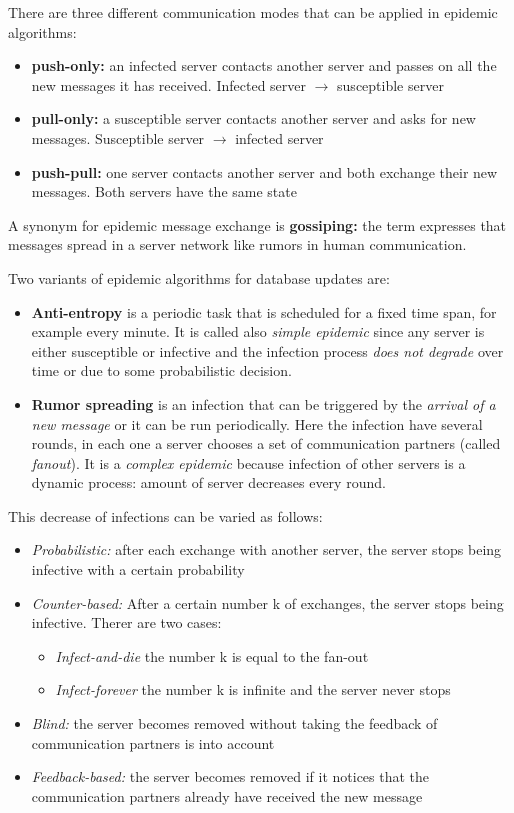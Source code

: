 There are three different communication modes that can be applied in epidemic algorithms:
\begin{itemize}
    \item \textbf{push-only:} an infected server contacts another server and passes on all the new messages it has received. Infected server \(\rightarrow\) susceptible server
    \item \textbf{pull-only:} a susceptible server contacts another server and asks for new messages. Susceptible server \(\rightarrow\) infected server
    \item \textbf{push-pull:} one server contacts another server and both
exchange their new messages. Both servers have the same state
\end{itemize}

A synonym for epidemic message exchange is \textbf{gossiping:} the term expresses that messages spread in a server network like rumors in human communication.

Two variants of epidemic algorithms for database updates are:
\begin{itemize}
    \item \textbf{Anti-entropy} is a periodic task that is scheduled for a fixed time span, for example every minute. It is called also \textit{simple epidemic} since any server is either susceptible or infective and the infection process \textit{does not degrade} over time or due to some probabilistic decision.
    \item \textbf{Rumor spreading} is an infection that can be triggered by the \textit{arrival of a new message} or it can be run periodically. Here the infection have several rounds, in each one a server chooses a set of communication partners (called \textit{fanout}). It is a \textit{complex epidemic} because infection of other servers is a dynamic process: amount of server decreases every round.
\end{itemize}
This decrease of infections can be varied as follows:
\begin{itemize}
        \item \textit{Probabilistic:} after each exchange with another server, the server stops being infective with a certain probability
        \item \textit{Counter-based:} After a certain number k of exchanges, the server stops being infective. Therer are two cases:
        \begin{itemize}
            \item \textit{Infect-and-die} the number k is equal to the fan-out
            \item \textit{Infect-forever} the number k is infinite and the server never stops
        \end{itemize}
        \item \textit{Blind:} the server becomes removed without taking the feedback of communication partners is into account
        \item \textit{Feedback-based:} the server becomes removed if it notices that the communication partners already have received the new message
    \end{itemize}
    
